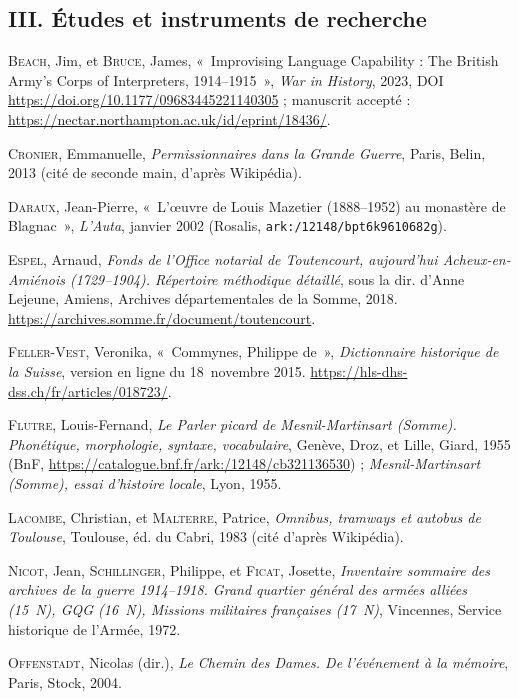 \subsection*{\normalsize\upshape\bfseries III. Études et instruments de recherche}

\begin{biblist}
\item \textsc{Beach}, Jim, et \textsc{Bruce}, James, «~Improvising Language Capability : The British Army's Corps of Interpreters, 1914--1915~», \textit{War in History}, 2023, DOI \url{https://doi.org/10.1177/09683445221140305} ; manuscrit accepté : \url{https://nectar.northampton.ac.uk/id/eprint/18436/}.
\item \textsc{Cronier}, Emmanuelle, \textit{Permissionnaires dans la Grande Guerre}, Paris, Belin, 2013 (cité de seconde main, d'après Wikipédia).
\item \textsc{Daraux}, Jean-Pierre, «~L'œuvre de Louis Mazetier (1888--1952) au monastère de Blagnac~», \textit{L'Auta}, janvier 2002 (Rosalis, \nolinkurl{ark:/12148/bpt6k9610682g}).
\item \textsc{Espel}, Arnaud, \textit{Fonds de l'Office notarial de Toutencourt, aujourd'hui Acheux-en-Amiénois (1729--1904). Répertoire méthodique détaillé}, sous la dir. d'Anne Lejeune, Amiens, Archives départementales de la Somme, 2018. \url{https://archives.somme.fr/document/toutencourt}.
\item \textsc{Feller-Vest}, Veronika, «~Commynes, Philippe de~», \textit{Dictionnaire historique de la Suisse}, version en ligne du 18~novembre 2015. \url{https://hls-dhs-dss.ch/fr/articles/018723/}.
\item \textsc{Flutre}, Louis-Fernand, \textit{Le Parler picard de Mesnil-Martinsart (Somme). Phonétique, morphologie, syntaxe, vocabulaire}, Genève, Droz, et Lille, Giard, 1955 (BnF, \url{https://catalogue.bnf.fr/ark:/12148/cb321136530}) ; \textit{Mesnil-Martinsart (Somme), essai d'histoire locale}, Lyon, 1955.
\item \textsc{Lacombe}, Christian, et \textsc{Malterre}, Patrice, \textit{Omnibus, tramways et autobus de Toulouse}, Toulouse, éd. du Cabri, 1983 (cité d'après Wikipédia).
\item \textsc{Nicot}, Jean, \textsc{Schillinger}, Philippe, et \textsc{Ficat}, Josette, \textit{Inventaire sommaire des archives de la guerre 1914--1918. Grand quartier général des armées alliées (15~N), GQG (16~N), Missions militaires françaises (17~N)}, Vincennes, Service historique de l'Armée, 1972.
\item \textsc{Offenstadt}, Nicolas (dir.), \textit{Le Chemin des Dames. De l'événement à la mémoire}, Paris, Stock, 2004.

\end{biblist}
